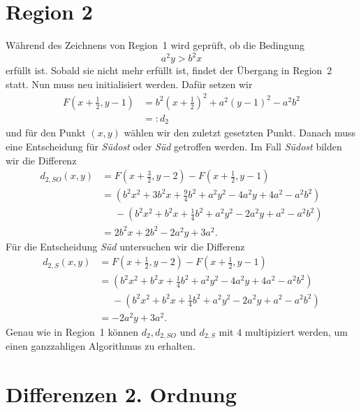 \documentclass[12pt]{scrartcl}
\begin{document}
\section*{Region 2}
Während des Zeichnens von Region~1 wird geprüft, ob die Bedingung
\[
  a^2 y > b^2 x
\]
erfüllt ist.
Sobald sie nicht mehr erfüllt ist, findet der Übergang in Region~2 statt.
Nun muss neu initialisiert werden.
Dafür setzen wir 
\begin{align*}
  F(x+\frac{1}{2}, y-1) & = b^2 (x+\frac{1}{2})^2 + a^2 (y-1)^2 - a^2 b^2\\
                        & =: d_2
\end{align*}
und für den Punkt $(x,y)$ wählen wir den zuletzt gesetzten Punkt.
Danach muss eine Entscheidung für {\em Südost} oder {\em Süd} getroffen werden.
Im Fall {\em Südost} bilden wir die Differenz
\begin{align*}
  d_{2,SO}(x,y) & = F(x+\frac{3}{2},y-2) - F(x+\frac{1}{2},y-1)                           \\
                & = (b^2 x^2 + 3 b^2 x + \frac{9}{4} b^2 + a^2 y^2 - 4 a^2 y + 4 a^2 - a^2 b^2)\\
                & \phantom{=} - (b^2 x^2 + b^2 x + \frac{1}{4} b^2 + a^2 y^2 - 2 a^2 y + a^2 - a^2 b^2)\\
                & =   2 b^2 x + 2 b^2 - 2 a^2 y + 3 a^2.
\end{align*}
Für die Entscheidung {\em Süd} untersuchen wir die Differenz
\begin{align*}
  d_{2,S}(x,y) & = F(x+\frac{1}{2},y-2) - F(x+\frac{1}{2},y-1)                           \\
               & = (b^2 x^2 + b^2 x + \frac{1}{4} b^2 + a^2 y^2 - 4 a^2 y + 4 a^2 - a^2 b^2)\\
               & \phantom{=} - (b^2 x^2 + b^2 x + \frac{1}{4} b^2 + a^2 y^2 - 2 a^2 y + a^2 - a^2 b^2)\\
               & =   - 2 a^2 y + 3 a^2.
\end{align*}
Genau wie in Region~1 können $d_2, d_{2,SO}$ und $d_{2,S}$ mit $4$ multipiziert werden, um einen ganzzahligen Algorithmus zu erhalten.


\section*{Differenzen 2. Ordnung}
\end{document}
